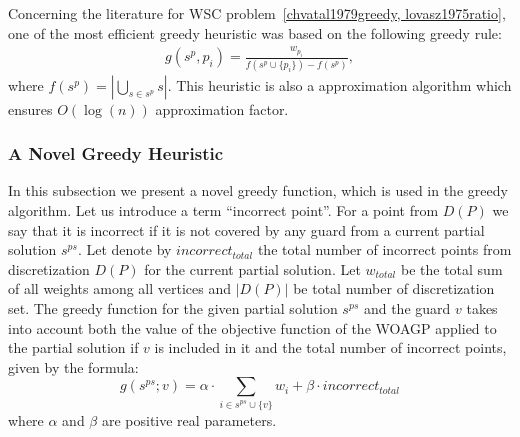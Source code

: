 \documentclass[runningheads,a4paper]{elsarticle}
\begin{document}
      Concerning the literature for WSC problem~\ref{chvatal1979greedy, lovasz1975ratio}, one of the most efficient greedy heuristic was based on the following greedy rule:
     \begin{align}
     g(s^p, p_i) = \frac{w_{p_i}}{ f(s^p \cup \{p_i\})  - f(s^p)},
     \end{align}
     where $f(s^p) = |\bigcup_{s \in s^p} s |$.
     This heuristic is also a approximation algorithm which ensures $O(\log(n))$ approximation factor.

        \subsubsection{A Novel Greedy Heuristic}
        In this subsection we present a novel greedy function, which is used in the greedy algorithm. Let us introduce a term  ``incorrect point''. For a point from $D(P)$ we say that it is incorrect if it is not covered by any guard from a current partial solution $s^{ps}$. Let denote by $incorrect_{total}$ the total number of incorrect points from discretization $D(P)$ for the current partial solution.  Let $w_{total}$ be the total sum of all weights among all vertices and $|D(P)|$ be total number of discretization set. The greedy function for the given partial solution $s^{ps}$ and the guard $v$ takes into account both the value of the objective function of the WOAGP  applied to the partial solution if $v$ is included in it and the total number of incorrect points, given by the formula:
        \begin{equation}\label{eq:greedyfun2}
				g(s^{ps}; v) = \alpha \cdot \sum_{i \in s^{ps} \cup \{v\}} w_i+ \beta \cdot {incorrect_{total}}
		\end{equation}
where $\alpha$ and $\beta$ are positive real parameters.
\end{document}
